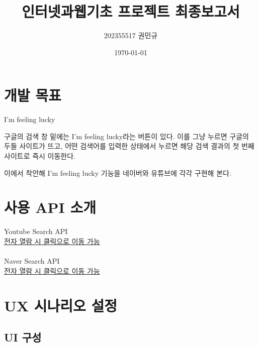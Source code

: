 \documentclass[a4paper, titlepage]{article}
\title{인터넷과웹기초 프로젝트 최종보고서}
\author{202355517 권민규}
\date{\today}
\begin{document}
\maketitle

\section{개발 목표}
I'm feeling lucky

구글의 검색 창 밑에는 I'm feeling lucky라는 버튼이 있다. 이를 그냥 누르면 구글의 두들 사이트가 뜨고, 어떤 검색어를 입력한 상태에서 누르면 해당 검색 결과의 첫 번째 사이트로 즉시 이동한다.

이에서 착안해 I'm feeling lucky 기능을 네이버와 유튜브에 각각 구현해 본다.


\section{사용 API 소개}
Youtube Search API\\
\href{https://developers.google.com/youtube/v3/docs/search/list?hl=ko}{전자 열람 시 클릭으로 이동 가능}\\\\
Naver Search API\\
\href{https://developers.naver.com/apps/#/cooperation}{전자 열람 시 클릭으로 이동 가능}


\section{UX 시나리오 설정}

\subsection{UI 구성}
\end{document}
